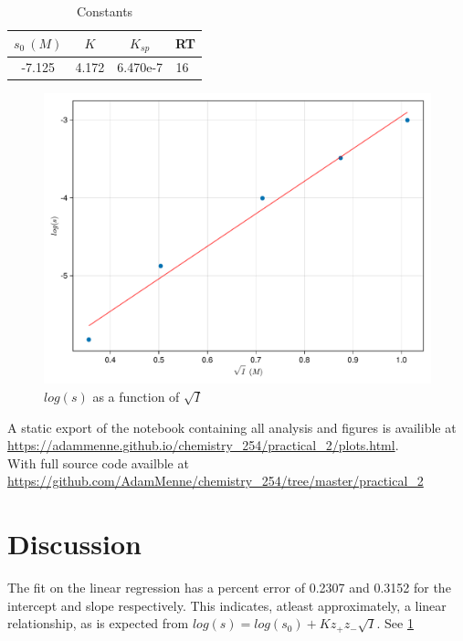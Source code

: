 \documentclass[a4paper, british]{article}
\begin{document}
\begin{table}[htb]
    \centering
    \caption{Constants}
    \begin{tabular}{cccc}
        \addlinespace
        \toprule
        \(s_0\ (M)\) & \(K\) & \(K_{sp}\) & RT\\ 
        \midrule
        -7.125 & 4.172 & 6.470e-7 & 16\ \textcelsius{}\\
        \bottomrule
        \end{tabular}
        \label{table:constants}   
\end{table}

\begin{figure}[htb]
    \centering
    \includegraphics[width=\textwidth]{figures/regression.pdf}
    \caption{\(log(s)\) as a function of \(\sqrt{I}\)}
    \label{fig:regression}
\end{figure}


A static export of the notebook containing all analysis and figures is availible at \url{https://adammenne.github.io/chemistry_254/practical_2/plots.html}.\\ With full source code availble at \url{https://github.com/AdamMenne/chemistry_254/tree/master/practical_2}

\section{Discussion}

The fit on the linear regression has a percent error of 0.2307 and  0.3152 for the intercept and slope respectively. This indicates, atleast approximately, a linear relationship, as is expected from \(log(s) = log(s_0) + Kz_+ z_- \sqrt{I}\). See \cref{fig:regression}
\end{document}
